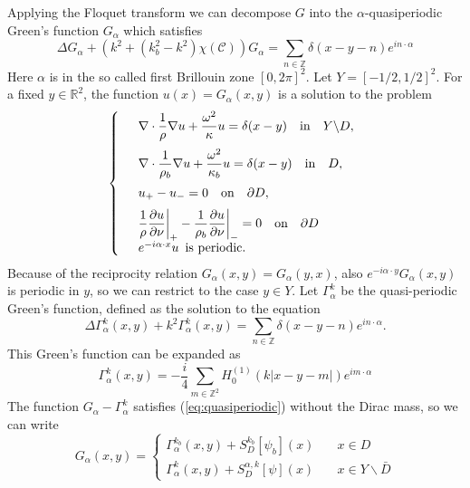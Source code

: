 \documentclass[a4paper]{article}
\theoremstyle{definition}
\newcommand{\Z}{\mathbb{Z}}
\newcommand{\R}{\mathbb{R}}
\newcommand{\C}{\mathcal{C}}
\newcommand{\ds}{\displaystyle}
\newcommand{\eqnref}[1]{(\ref {#1})}
\def\nm{\noalign{\medskip}}
\begin{document}
Applying the Floquet transform we can decompose $G$ into the $\alpha$-quasiperiodic Green's function $G_\alpha$ which satisfies
\begin{equation*}
\Delta G_\alpha + (k^2+(k_b^2-k^2)\chi(\C))G_\alpha = \sum_{n\in \Z} \delta(x-y-n)e^{in\cdot\alpha}
\end{equation*}
Here $\alpha$ is in the so called first Brillouin zone $[0,2\pi]^2$. Let $Y= [-1/2,1/2]^2$. For a fixed $y\in \R^2$, the function $u(x)=G_\alpha(x,y)$ is a solution to the problem
\begin{equation} \label{eq:quasiperiodic}
\left\{
\begin{array} {ll}
&\ds \nabla \cdot \frac{1}{\rho} \nabla  u+ \frac{\omega^2}{\kappa} u  = \delta(x-y) \quad \text{in} \quad Y \backslash D, \\
\nm
&\ds \nabla \cdot \frac{1}{\rho_b} \nabla  u+ \frac{\omega^2}{\kappa_b} u  = \delta(x-y) \quad \text{in} \quad D, \\
\nm
&\ds  u_{+} -u_{-}  =0   \quad \text{on} \quad \partial D, \\
\nm
& \ds  \frac{1}{\rho} \frac{\partial u}{\partial \nu} \bigg|_{+} - \frac{1}{\rho_b} \frac{\partial u}{\partial \nu} \bigg|_{-} =0 \quad \text{on} \quad \partial D \\
&  e^{-i \alpha \cdot x} u  \,\,\,  \text{is periodic.}
\end{array}
\right.
\end{equation}
Because of the reciprocity relation $G_\alpha(x,y) = G_\alpha(y,x)$, also $e^{-i \alpha \cdot y} G_\alpha(x,y)$ is periodic in $y$, so we can restrict to the case $y\in Y$. Let $\Gamma_\alpha^k$ be the quasi-periodic Green's function, defined as the solution to the equation
\begin{equation*}
\Delta \Gamma_\alpha^k(x,y) + k^2\Gamma_\alpha^k(x,y) = \sum_{n\in \Z} \delta(x-y-n)e^{in\cdot\alpha}.
\end{equation*}
This Green's function can be expanded as
\begin{equation} \label{eq:quasihomogenious}
\Gamma_\alpha^k(x,y) = -\frac{i}{4}\sum_{m\in \Z^2} H_0^{(1)}(k|x-y-m|)e^{im\cdot\alpha}
\end{equation}
The function $G_\alpha-\Gamma_\alpha^k$ satisfies \eqnref{eq:quasiperiodic} without the Dirac mass, so we can write
\begin{equation} \label{eq:G_a}
G_\alpha(x,y) = \begin{cases} \Gamma_\alpha^{k_b}(x,y) + S_D^{k_b}[\psi_b](x) \quad &x\in D \\  \Gamma_\alpha^{k}(x,y) + S_D^{\alpha,k}[\psi](x) &x\in Y \backslash \bar{D} \end{cases}
\end{equation}
\end{document}
